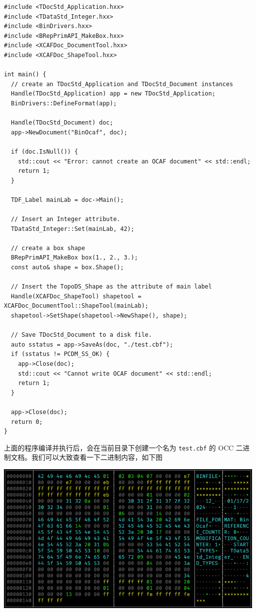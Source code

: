 \documentclass[11pt]{article}
\begin{document}
\begin{verbatim}
#include <TDocStd_Application.hxx>
#include <TDataStd_Integer.hxx>
#include <BinDrivers.hxx>
#include <BRepPrimAPI_MakeBox.hxx>
#include <XCAFDoc_DocumentTool.hxx>
#include <XCAFDoc_ShapeTool.hxx>

int main() {
  // create an TDocStd_Application and TDocStd_Document instances
  Handle(TDocStd_Application) app = new TDocStd_Application;
  BinDrivers::DefineFormat(app);

  Handle(TDocStd_Document) doc;
  app->NewDocument("BinOcaf", doc);

  if (doc.IsNull()) {
    std::cout << "Error: cannot create an OCAF document" << std::endl;
    return 1;
  }

  TDF_Label mainLab = doc->Main();

  // Insert an Integer attribute.
  TDataStd_Integer::Set(mainLab, 42);

  // create a box shape
  BRepPrimAPI_MakeBox box(1., 2., 3.);
  const auto& shape = box.Shape();

  // Insert the TopoDS_Shape as the attribute of main label
  Handle(XCAFDoc_ShapeTool) shapetool = XCAFDoc_DocumentTool::ShapeTool(mainLab);
  shapetool->SetShape(shapetool->NewShape(), shape);

  // Save TDocStd_Document to a disk file.
  auto sstatus = app->SaveAs(doc, "./test.cbf");
  if (sstatus != PCDM_SS_OK) {
    app->Close(doc);
    std::cout << "Cannot write OCAF document" << std::endl;
    return 1;
  }

  app->Close(doc);
  return 0;
}
\end{verbatim}

上面的程序编译并执行后，会在当前目录下创建一个名为 \texttt{test.cbf} 的 OCC 二进制文档。我们可以大致查看一下二进制内容，如下图

\begin{center}
\includegraphics[width=.9\linewidth]{./img/binocaf-binary-content.png}
\end{center}
\end{document}
